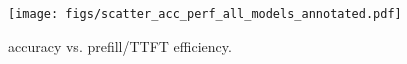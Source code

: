 \begin{figure}[!t]
    \centering
    \texttt{[image: figs/scatter\_acc\_perf\_all\_models\_annotated.pdf]}
    \caption{\lmm{} accuracy vs. prefill/TTFT efficiency.
    }
    \label{fig:scatter-plot-lmms}
\end{figure}